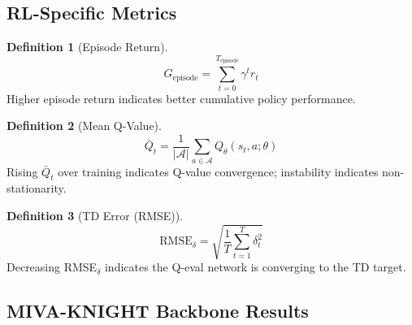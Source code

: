 \documentclass[12pt,a4paper]{article}
\theoremstyle{definition}
\newtheorem{definition}{Definition}[section]
\theoremstyle{plain}
\theoremstyle{remark}
\newcommand{\Qeval}{Q_\theta}
\begin{document}
\subsection{RL-Specific Metrics}

\begin{definition}[Episode Return]
\[
  G_{\text{episode}} = \sum_{t=0}^{T_{\text{episode}}} \gamma^t r_t
\]
Higher episode return indicates better cumulative policy performance.
\end{definition}

\begin{definition}[Mean Q-Value]
\[
  \bar{Q}_t = \frac{1}{|\mathcal{A}|}\sum_{a \in \mathcal{A}} \Qeval(s_t, a; \theta)
\]
Rising $\bar{Q}_t$ over training indicates Q-value convergence; instability indicates non-stationarity.
\end{definition}

\begin{definition}[TD Error (RMSE)]
\[
  \text{RMSE}_\delta = \sqrt{\frac{1}{T}\sum_{t=1}^T \delta_t^2}
\]
Decreasing RMSE$_\delta$ indicates the Q-eval network is converging to the TD target.
\end{definition}

\subsection{MIVA-KNIGHT Backbone Results}
\end{document}
